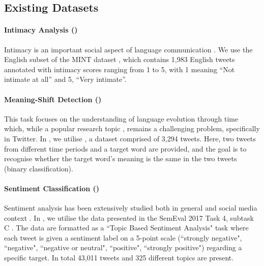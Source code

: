 \subsection{Existing Datasets}
\paragraph{Intimacy Analysis ({\TweetIntimacy})} Intimacy is an important social aspect of language communication \citep{pei2020quantifying}. We use the English subset of the \textsc{MINT} dataset \citep{pei2023semeval}, which contains 1,983 English tweets annotated with intimacy scores ranging from 1 to 5, with 1 meaning ``Not intimate at all'' and 5, ``Very intimate''. 

\paragraph{Meaning-Shift Detection ({\TempoWiC})} This task focuses on the understanding of language evolution through time which, while a popular research topic \cite{luu-etal-2022-time, agarwal2022temporal}, remains a challenging problem, specifically in Twitter. In {\DATASET}, we utilise {\TempoWiC} \cite{loureiro-etal-2022-tempowic}, a dataset comprised of 3,294 tweets. Here, two tweets from different time periods and a target word are provided, and the goal is to recognise whether the target word's meaning is the same in the two tweets (binary classification).


\paragraph{Sentiment Classification ({\TweetSentiment})} Sentiment analysis has been extensively studied both in general \cite{medhat2014sentiment, wankhade2022survey} and social media context \cite{barbieri2021xlm, marcec2022using}. In {\DATASET}, we utilise the data presented in the SemEval 2017 Task 4, subtask C \cite{rosenthal2017semeval}. The data are formatted as a  ``Topic Based Sentiment Analysis" task where each tweet is given a sentiment label on a 5-point scale (``strongly negative", ``negative", ``negative or neutral", ``positive", ``strongly positive") regarding a specific target. In total 43,011 tweets and 325 different topics are present.

